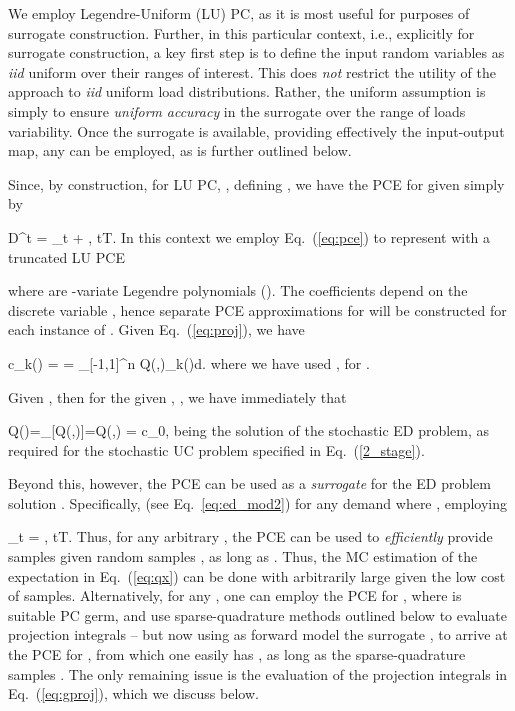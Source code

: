 \documentclass[conference]{IEEEtran}
\newcommand{\be}{}
\newcommand{\xivec}{{\boldsymbol{\xi}}}
\begin{document}
We employ Legendre-Uniform (LU) PC, as it is most useful for purposes of
surrogate construction. Further, in this particular context, i.e.,
explicitly for surrogate construction, a key first step is to define the input
random variables as \emph{iid} uniform over their ranges of interest.  This does
\emph{not} restrict the utility of the approach to \emph{iid} uniform load
distributions. Rather, the uniform assumption is simply to ensure \emph{uniform}
\emph{accuracy} in the surrogate over the range of loads variability.  Once the
surrogate is available, providing effectively the input-output map, any
 can be employed, as is further outlined below.

Since, by construction, for LU PC, , defining
, we have the PCE for  given simply by
\be
D^t = \xi_t 
+ , \quad \forall t\in T.
\ee
In this context we employ Eq.~(\ref{eq:pce}) to represent  with a truncated LU PCE

where  are -variate Legendre polynomials ().
The coefficients  depend on
the discrete variable , hence separate PCE approximations for 
will be constructed for each instance of . Given Eq.~(\ref{eq:proj}), we have
\be
c_k() = =
\int_{[-1,1]^n} Q(,\xivec)\Psi_k(\xivec)d\xivec.
\label{eq:gproj}
\ee
where we have used , for . 

Given ,
then for the given , , we have immediately that
\be
{\overline Q}()=_\xivec[Q(,\xivec)]=\langle Q(,\xivec) \rangle = c_0,
\ee
being the solution of the stochastic ED problem, as required for the stochastic UC problem specified in
Eq.~(\ref{2_stage}). 

Beyond this, however, the PCE  can be used as a
\emph{surrogate} for the ED problem solution . Specifically,
 (see Eq.~\ref{eq:ed_mod2})
for any demand  where , employing 
\be
\xi_t = , \quad \forall t\in T.
\label{eq:D2xi}
\ee
Thus, for any arbitrary , the PCE  can be used to \emph{efficiently} provide samples
 given random samples , as long as .  Thus, the MC estimation of
the expectation  in Eq.~(\ref{eq:qx}) can be done with arbitrarily large  given
the low cost of samples. Alternatively, for any , one can
employ the PCE for , where  is suitable PC
germ, and use sparse-quadrature methods outlined below to evaluate projection
integrals -- but now using as forward model the surrogate
, to arrive at
the PCE for , from which one easily has , as long as the sparse-quadrature samples .  The only remaining issue is the evaluation of the projection
integrals in Eq.~(\ref{eq:gproj}), which we discuss below.
\end{document}
